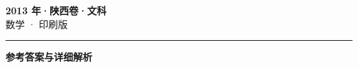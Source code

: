 \documentclass[zihao=5, a4paper]{ctexart}
\begin{document}
\begin{center}
  {\Large\bfseries 2013 年·陕西卷·文科}\\[4pt]
  {\large 数学 · 印刷版}
\end{center}
\medskip
{}

\par\bigskip\hrule\bigskip
{}
\Needspace{0.55\textheight}
\begin{center}{\large\bfseries 参考答案与详细解析}\end{center}
\smallskip

\end{document}
